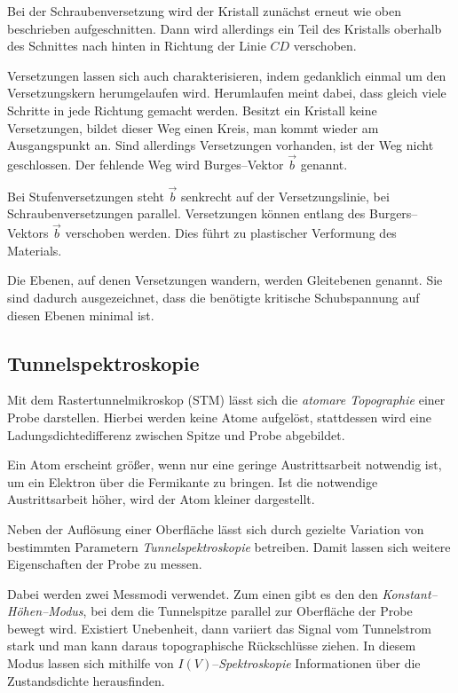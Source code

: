 \documentclass[12pt,a4paper]{scrartcl}
\numberwithin{equation}{section} %
\begin{document}
Bei der Schraubenversetzung wird der Kristall zunächst erneut wie oben beschrieben aufgeschnitten. Dann wird allerdings ein Teil des Kristalls oberhalb des Schnittes nach hinten in Richtung der Linie $CD$ verschoben.

Versetzungen lassen sich auch charakterisieren, indem gedanklich einmal um den Versetzungskern herumgelaufen wird. Herumlaufen meint dabei, dass gleich viele Schritte in jede Richtung gemacht werden. Besitzt ein Kristall keine Versetzungen, bildet dieser Weg einen Kreis, man kommt wieder am Ausgangspunkt an. Sind allerdings Versetzungen vorhanden, ist der Weg nicht geschlossen. Der fehlende Weg wird Burges--Vektor $\vec{b}$ genannt.

Bei Stufenversetzungen steht $\vec{b}$ senkrecht auf der Versetzungslinie, bei Schraubenversetzungen parallel. \cite{Gross} %
Versetzungen können entlang des Burgers--Vektors $\vec{b}$ verschoben werden. Dies führt zu plastischer Verformung des Materials.

Die Ebenen, auf denen Versetzungen wandern, werden Gleitebenen genannt. Sie sind dadurch ausgezeichnet, dass die benötigte kritische Schubspannung auf diesen Ebenen minimal ist.

\hypertarget{tunnelspektroskopie}{%
\subsection{Tunnelspektroskopie}\label{tunnelspektroskopie}}
Mit dem Rastertunnelmikroskop (STM) lässt sich die \textit{atomare Topographie} einer Probe darstellen. Hierbei werden keine Atome aufgelöst, stattdessen wird eine Ladungsdichtedifferenz zwischen Spitze und Probe abgebildet.

Ein Atom erscheint größer, wenn nur eine geringe Austrittsarbeit notwendig ist, um ein Elektron
über die Fermikante zu bringen. Ist die notwendige Austrittsarbeit höher, wird der Atom kleiner dargestellt.

Neben der Auflösung einer Oberfläche lässt sich durch gezielte Variation von bestimmten Parametern \textit{Tunnelspektroskopie} betreiben. Damit lassen sich weitere Eigenschaften der Probe zu messen.

Dabei werden zwei Messmodi verwendet. Zum einen gibt es den den \textit{Konstant--Höhen--Modus}, bei dem die Tunnelspitze parallel zur Oberfläche der Probe bewegt wird. Existiert Unebenheit, dann variiert das Signal vom Tunnelstrom stark und man kann daraus topographische Rückschlüsse ziehen. In diesem Modus lassen sich mithilfe von $I(V)$--\textit{Spektroskopie} Informationen über die Zustandsdichte herausfinden.
\end{document}
